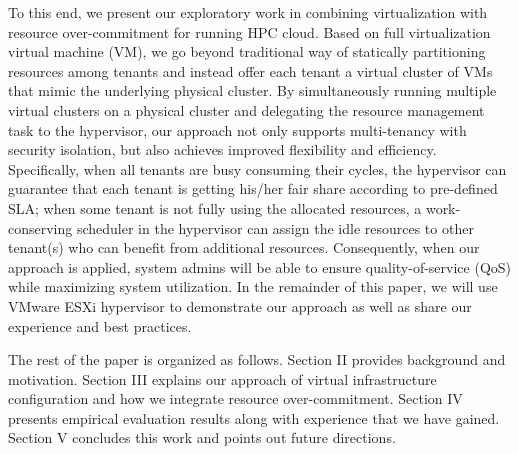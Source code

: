 To this end, we present our exploratory work in combining virtualization with resource over-commitment for running HPC cloud.
Based on full virtualization virtual machine (VM), we go beyond traditional way of 
statically partitioning resources among tenants and instead offer each tenant a virtual 
cluster of VMs that mimic the underlying physical cluster. By simultaneously running 
multiple virtual clusters on a physical cluster and delegating the resource management task 
to the hypervisor, our approach not only supports 
multi-tenancy with security isolation, but also achieves improved flexibility and efficiency. Specifically, when all tenants are busy consuming their cycles, 
the hypervisor can guarantee that each tenant is getting his/her fair share according to pre-defined SLA; when 
some tenant is not fully using the allocated resources, a work-conserving scheduler in the hypervisor can assign the idle resources to other tenant(s) who can benefit 
from additional resources. Consequently, when our approach is applied, system admins will be able to ensure quality-of-service (QoS) while maximizing system utilization. In the remainder of this paper, we will use VMware ESXi hypervisor to demonstrate our approach as well as share our experience and best practices. 

The rest of the paper is organized as follows. 
Section II provides background and motivation. Section III explains our approach of virtual infrastructure configuration and how we integrate resource over-commitment. Section IV presents empirical evaluation results along with experience that we have gained. Section V concludes this work and points out future directions.
